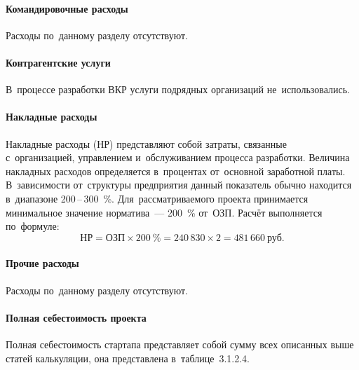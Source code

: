 \paragraph{Командировочные расходы}

Расходы по~данному разделу отсутствуют.

\paragraph{Контрагентские услуги}

В~процессе разработки ВКР услуги подрядных организаций не~использовались.

\paragraph{Накладные расходы}

Накладные расходы (НР) представляют собой затраты, связанные с~организацией,
управлением и~обслуживанием процесса разработки. Величина накладных расходов
определяется в~процентах от~основной заработной платы. В~зависимости
от~структуры предприятия данный показатель обычно находится в~диапазоне
200\,--\,300~\%. Для~рассматриваемого проекта принимается минимальное значение
норматива~--- 200~\% от~ОЗП. Расчёт выполняется по~формуле:
\[ \text{НР} = \text{ОЗП} \times 200~\% = 240\,830 \times 2 = 481\,660~\text{руб.} \]

\paragraph{Прочие расходы}

Расходы по~данному разделу отсутствуют.

\paragraph{Полная себестоимость проекта}

Полная себестоимость стартапа представляет собой сумму всех описанных выше
статей калькуляции, она представлена в~таблице~3.1.2.4.

